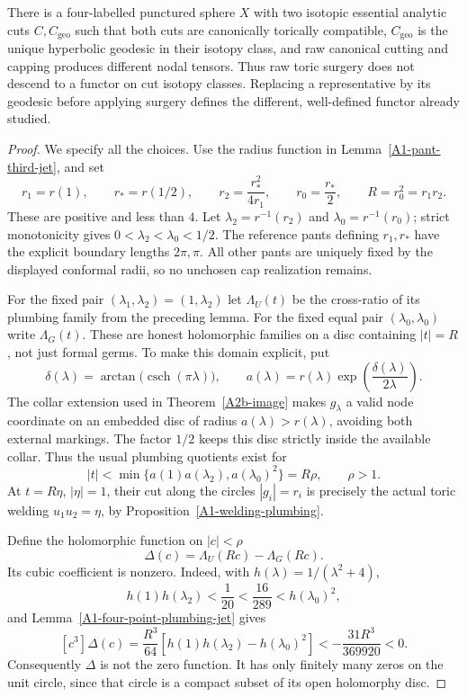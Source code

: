 \begin{theorem}
\label{A1-toric-nondescent}
There is a four-labelled punctured sphere $X$ with two isotopic
essential analytic cuts $C,C_{\mathrm{geo}}$ such that both cuts
are canonically torically compatible, $C_{\mathrm{geo}}$ is the
unique hyperbolic geodesic in their isotopy class, and raw canonical
cutting and capping produces different nodal tensors. Thus raw
toric surgery does not descend to a functor on cut isotopy classes.
Replacing a representative by its geodesic before applying surgery
defines the different, well-defined functor already studied.
\end{theorem}
\begin{proof}
We specify all the choices. Use the radius function in
Lemma~\ref{A1-pant-third-jet}, and set
\[
 r_1=r(1),\qquad r_*=r(1/2),\qquad
 r_2=\frac{r_*^2}{4r_1},\qquad
 r_0=\frac{r_*}{2},\qquad R=r_0^2=r_1r_2.
\]
These are positive and less than $4$. Let
$\lambda_2=r^{-1}(r_2)$ and $\lambda_0=r^{-1}(r_0)$; strict
monotonicity gives $0<\lambda_2<\lambda_0<1/2$.
The reference pants defining $r_1,r_*$ have the explicit boundary
lengths $2\pi,\pi$. All other pants are uniquely fixed by the
displayed conformal radii, so no unchosen cap realization remains.

For the fixed pair $(\lambda_1,\lambda_2)=(1,\lambda_2)$ let
$\Lambda_U(t)$ be the cross-ratio of its plumbing family from the
preceding lemma. For the fixed equal pair $(\lambda_0,\lambda_0)$
write $\Lambda_G(t)$. These are honest holomorphic families on a
disc containing $|t|=R$, not just formal germs. To make this
domain explicit, put
\[
 \delta(\lambda)=\arctan\!\bigl(\operatorname{csch}(\pi\lambda)\bigr),
 \qquad
 a(\lambda)=r(\lambda)
                 \exp\!\left(\frac{\delta(\lambda)}{2\lambda}\right).
\]
The collar extension used in Theorem~\ref{A2b-image} makes
$g_\lambda$ a valid node coordinate on an embedded disc of radius
$a(\lambda)>r(\lambda)$, avoiding both external markings.
The factor $1/2$ keeps this disc strictly inside the available
collar. Thus the usual plumbing quotients exist for
\[
 |t|<\min\{a(1)a(\lambda_2),a(\lambda_0)^2\}=R\rho,
 \qquad \rho>1.
\]
At $t=R\eta$, $|\eta|=1$, their cut along the circles
$|g_i|=r_i$ is precisely the actual toric welding
$u_1u_2=\eta$, by Proposition~\ref{A1-welding-plumbing}.

Define the holomorphic function on $|c|<\rho$
\[
                 \Delta(c)=\Lambda_U(Rc)-\Lambda_G(Rc).
\]
Its cubic coefficient is nonzero. Indeed, with
$h(\lambda)=1/(\lambda^2+4)$,
\[
 h(1)h(\lambda_2)<\frac1{20}
       <\frac{16}{289}<h(\lambda_0)^2,
\]
and Lemma~\ref{A1-four-point-plumbing-jet} gives
\[
 [c^3]\Delta(c)
   =\frac{R^3}{64}
       \left[h(1)h(\lambda_2)-h(\lambda_0)^2\right]
   <-\frac{31R^3}{369920}<0.
\]
Consequently $\Delta$ is not the zero function. It has only
finitely many zeros on the unit circle, since that circle is a
compact subset of its open holomorphy disc.


\end{proof}
